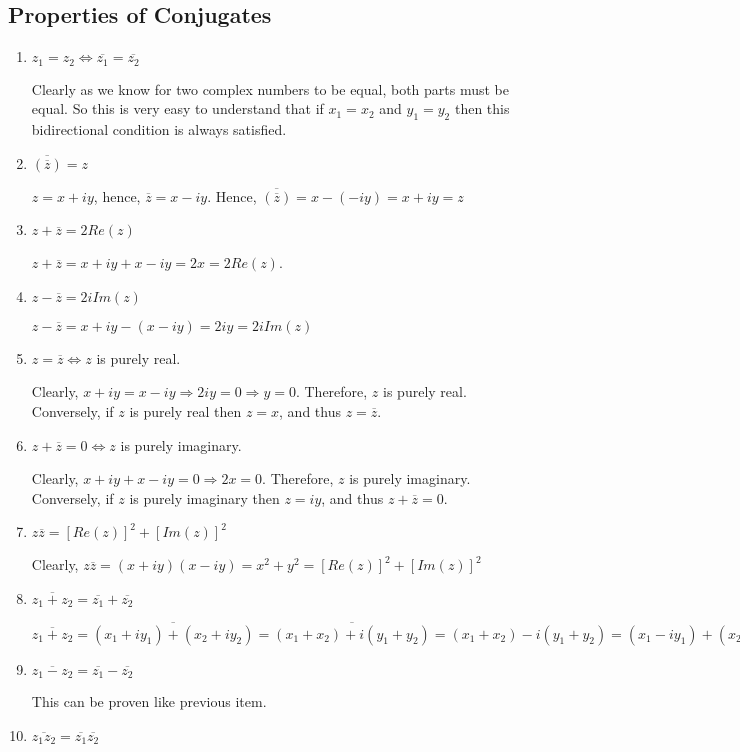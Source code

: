 \subsection{Properties of Conjugates}
\begin{enumerate}
\item $z_1 = z_2 \Leftrightarrow \overline{z_1} = \overline{z_2}$

  Clearly as we know for two complex numbers to be equal, both parts must be equal. So this is very easy to understand that if $x_1
  = x_2$ and $y_1 = y_2$ then this bidirectional condition is always satisfied.
\item $\overline{\left(\overline{z}\right)} = z$

  $z = x + iy$, hence, $\overline{z} = x - iy$. Hence, $\overline{\left(\overline{z}\right)} = x - (-iy) = x + iy = z$
\item $z + \overline{z} = 2Re(z)$

  $z + \overline{z} = x + iy + x - iy = 2x = 2Re(z)$.
\item $z - \overline{z} = 2iIm(z)$

  $z - \overline{z} = x + iy - (x - iy) = 2iy = 2iIm(z)$
\item $z = \overline{z} \Leftrightarrow z$ is purely real.

  Clearly, $x + iy = x - iy \Rightarrow 2iy = 0 \Rightarrow y = 0$. Therefore, $z$ is purely real. Conversely, if $z$ is purely
  real then $z = x$, and thus $z = \overline{z}$.
\item $z + \overline{z} = 0 \Leftrightarrow z$ is purely imaginary.

  Clearly, $x + iy + x - iy = 0 \Rightarrow 2x = 0$. Therefore, $z$ is purely imaginary. Conversely, if $z$ is purely imaginary
  then $z = iy$, and thus $z + \overline{z} = 0$.
\item $z\overline{z} = [Re(z)]^2 + [Im(z)]^2$

  Clearly, $z\overline{z} = (x + iy)(x - iy) = x^2 + y^2 = [Re(z)]^2 + [Im(z)]^2$
\item $\overline{z_1 + z_2} = \overline{z_1} + \overline{z_2}$

  $\overline{z_1 + z_2} = \overline{(x_1 + iy_1) + (x_2 + iy_2)} = \overline{(x_1 + x_2) + i(y_1 + y_2)} = (x_1 + x_2) - i(y_1 +
  y_2) = (x_1 - iy_1) + (x_2 - iy_2) = \overline{z_1} + \overline{z_2}$
\item $\overline{z_1 - z_2} = \overline{z_1} - \overline{z_2}$

  This can be proven like previous item.
\item $\overline{z_1z_2} = \overline{z_1}\overline{z_2}$


\end{enumerate}
